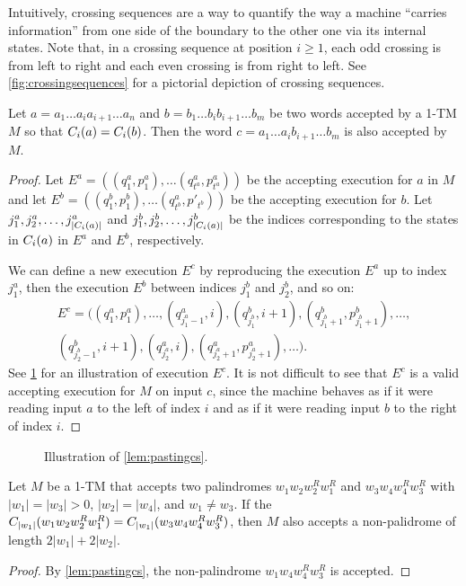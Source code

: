 Intuitively, crossing sequences are a way to quantify the way a machine ``carries information'' from one
side of the boundary to the other one via its internal states. Note that, in a crossing sequence at position
$i \geq 1$, each odd crossing is from left to right
and each even crossing is from right to left. 
See \cref{fig:crossingsequences} for a pictorial depiction of 
crossing sequences.

\begin{lemma}
    \label{lem:pastingcs}
    Let $a = a_1\ldots a_i a_{i+1} \ldots a_n$ and $b = b_1 \ldots b_i b_{i+1} \ldots b_m$ 
    be two words accepted by a 1-TM $M$ so that $C_i(a) = C_i(b)$.
    Then the word  $c = a_1\ldots a_i b_{i+1} \ldots b_m$ is also accepted by $M$.
\end{lemma}
\begin{proof}
Let $E^a = ((q^a_1, p^a_1), \ldots (q^a_{t^a}, p^a_{t^a}))$ be the accepting execution for $a$ in $M$ and let
$E^b = ((q^b_1, p^b_1), \ldots (q^a_{t^b}, p'_{t^b}))$ be the accepting execution for $b$. 
Let $j^a_1, j^a_2, \ldots, j^a_{|C_i(a)|}$ and $j^b_1, j^b_2, \ldots, j^b_{|C_i(a)|}$ be the indices
corresponding to the states in $C_i(a)$ in $E^a$ and $E^b$, respectively.

We can define a new execution $E^c$ by reproducing the execution $E^a$ up to index $j^a_1$, then the execution
$E^b$ between indices $j^b_1$ and $j^b_2$, and so on:
\begin{multline*}
E^c = ((q^a_1, p^a_1), \ldots, (q^a_{j^a_1-1}, i), (q^b_{j^b_1}, i+1), (q^b_{j^b_1+1}, p^b_{j^b_1+1}), \ldots, \\
(q^b_{j^b_2-1}, i+1), (q^a_{j^a_2}, i), (q^a_{j^a_2+1}, p^a_{j^a_2+1}), \ldots ).
\end{multline*}
See \cref{fig:pastingcs} for an illustration of execution $E^c$. It is not difficult to see that $E^c$ is a 
valid accepting execution for $M$ on input $c$, since the machine behaves as if it were reading input $a$ to the left
of index $i$ and as if it were reading input $b$ to the right of index $i$. 

\end{proof}

\begin{figure}
    \label{fig:pastingcs}
    \caption{Illustration of \cref{lem:pastingcs}.}
\end{figure}

\begin{corollary}
    \label{cor:crosscollision}
    Let $M$ be a 1-TM that accepts two palindromes $w_1 w_2 w_2^R w_1^R$ and
    $w_3 w_4 w_4^R w_3^R$ with $|w_1| = |w_3| > 0$, $|w_2| = |w_4|$, and $w_1 \neq w_3$. 
    If the $C_{|w_1|}(w_1 w_2 w_2^R w_1^R) = C_{|w_1|}(w_3 w_4 w_4^R w_3^R)$, 
    then $M$ also accepts a non-palidrome of length $2|w_1| + 2|w_2|$.
\end{corollary}
\begin{proof}
By \cref{lem:pastingcs}, the non-palindrome $w_1 w_4 w_4^R w_3^R$ is accepted. 
\end{proof}

